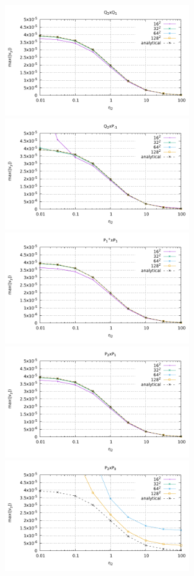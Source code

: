 \begin{center}
\includegraphics[width=8cm]{python_codes/fieldstone_120/paperresults/rt/structured/rt_wave_vel_Q2Q1.pdf}
\includegraphics[width=8cm]{python_codes/fieldstone_120/paperresults/rt/structured/rt_wave_vel_Q2Pm1.pdf}\\
\includegraphics[width=8cm]{python_codes/fieldstone_120/paperresults/rt/structured/rt_wave_vel_P1+P1.pdf}
\includegraphics[width=8cm]{python_codes/fieldstone_120/paperresults/rt/structured/rt_wave_vel_P2P1.pdf}\\
\includegraphics[width=8cm]{python_codes/fieldstone_120/paperresults/rt/structured/rt_wave_vel_P2P0.pdf}

\end{center}
